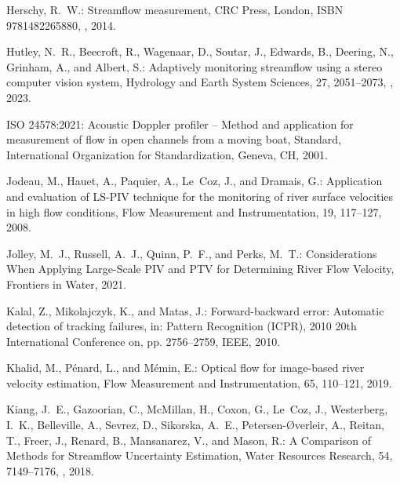 \documentclass[hess, manuscript]{copernicus} %
\begin{document}
\begin{thebibliography}{70}
Herschy, R.~W.: Streamflow measurement, CRC Press, London, ISBN 9781482265880,
  , 2014.

Hutley, N.~R., Beecroft, R., Wagenaar, D., Soutar, J., Edwards, B., Deering,
  N., Grinham, A., and Albert, S.: Adaptively monitoring streamflow using a
  stereo computer vision system, Hydrology and Earth System Sciences, 27,
  2051--2073, , 2023.

ISO 24578:2021: Acoustic Doppler profiler -- Method and application for
  measurement of flow in open channels from a moving boat, Standard,
  International Organization for Standardization, Geneva, CH, 2001.

Jodeau, M., Hauet, A., Paquier, A., Le~Coz, J., and Dramais, G.: Application
  and evaluation of LS-PIV technique for the monitoring of river surface
  velocities in high flow conditions, Flow Measurement and Instrumentation, 19,
  117--127, 2008.

Jolley, M.~J., Russell, A.~J., Quinn, P.~F., and Perks, M.~T.: Considerations
  When Applying Large-Scale PIV and PTV for Determining River Flow Velocity,
  Frontiers in Water, 2021.

Kalal, Z., Mikolajczyk, K., and Matas, J.: Forward-backward error: Automatic
  detection of tracking failures, in: Pattern Recognition (ICPR), 2010 20th
  International Conference on, pp. 2756--2759, IEEE, 2010.

Khalid, M., P{\'e}nard, L., and M{\'e}min, E.: Optical flow for image-based
  river velocity estimation, Flow Measurement and Instrumentation, 65,
  110--121, 2019.

Kiang, J.~E., Gazoorian, C., McMillan, H., Coxon, G., Le~Coz, J., Westerberg,
  I.~K., Belleville, A., Sevrez, D., Sikorska, A.~E., Petersen-Øverleir, A.,
  Reitan, T., Freer, J., Renard, B., Mansanarez, V., and Mason, R.: A
  Comparison of Methods for Streamflow Uncertainty Estimation, Water Resources
  Research, 54, 7149--7176, , 2018.


\end{thebibliography}
\end{document}
